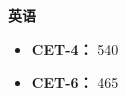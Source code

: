 

\textbf{英语} 
\vspace{-0.3cm}
\begin{itemize}
	\item \textbf{CET-4：} 540
	\vspace{-0.3cm}
	\item \textbf{CET-6：} 465
\end{itemize}




